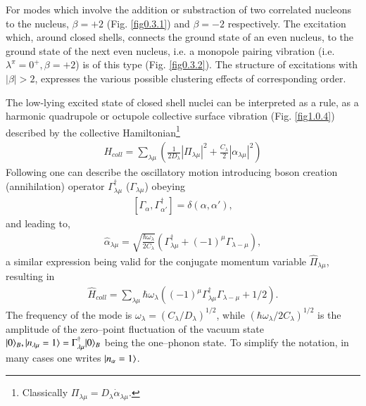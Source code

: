 For modes which involve the addition or substraction of two correlated nucleons to the nucleus, $\beta=+2$ (Fig. \ref{fig0.3.1}) and $\beta=-2$ respectively. The excitation which, around closed shells, connects the ground state of an even nucleus, to the ground state of the next even nucleus, i.e. a monopole pairing vibration (i.e. $\lambda^\pi=0^+, \beta=+2$) is of this type (Fig. \ref{fig0.3.2}).
The structure of excitations with $|\beta|>2$, expresses the various possible clustering effects of corresponding order.

The low-lying excited state of closed shell nuclei can be interpreted as a rule, as a harmonic quadrupole or octupole collective surface vibration (Fig. \ref{fig1.0.4}) described by the collective Hamiltonian\footnote{Classically $\Pi_{\lambda\mu}=D_\lambda\dot\alpha_{\lambda\mu}$.}
\begin{align}\label{eq1.0.7}
H_{coll}=\sum_{\lambda\mu}\left(\frac{1}{2D_{\lambda}}|\Pi_{\lambda\mu}|^2+\frac{C_\lambda}{2}|\alpha_{\lambda\mu}|^2\right)
\end{align}
Following \cite{Dirac:26} one can describe the oscillatory motion introducing boson creation (annihilation) operator $\Gamma_{\lambda\mu}^\dagger$ ($\Gamma_{\lambda\mu}$) obeying
\begin{align}\label{eq1.0.8}
\left[\Gamma_{\alpha},\Gamma_{\alpha'}^\dagger\right]=\delta(\alpha,\alpha'),
\end{align}
and leading to, 
\begin{align}\label{eq1.0.9}
\hat\alpha_{\lambda\mu}=\sqrt{\frac{\hbar\omega_\lambda}{2C_\lambda}}\left(\Gamma_{\lambda\mu}^\dagger+(-1)^\mu\Gamma_{\lambda-\mu}\right),
\end{align}
 a similar expression being valid for the conjugate momentum variable $\hat\Pi_{\lambda\mu}$, resulting in 
\begin{align}\label{eq1.0.9b}
\hat H_{coll}=\sum_{\lambda\mu}\hbar\omega_\lambda\left((-1)^\mu\Gamma_{\lambda\mu}^\dagger\Gamma_{\lambda-\mu}+1/2\right).
\end{align}
The frequency of the mode is $\omega_\lambda=(C_\lambda/D_\lambda)^{1/2}$, while $(\hbar\omega_\lambda/2C_\lambda)^{1/2}$ is the amplitude of the zero--point fluctuation of the vacuum state $|{0} \rangle_B,|{n_{\lambda\mu}=1} \rangle=\Gamma_{\lambda\mu}^\dagger |{0} \rangle_B$ being the one--phonon state. To simplify the notation, in many cases one writes $|{n_\alpha=1} \rangle$.
